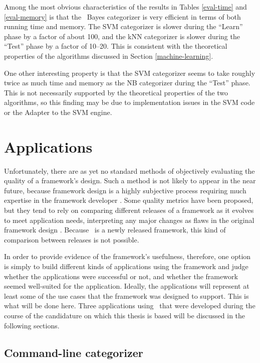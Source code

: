 Among the most obvious characteristics of the results in Tables
\ref{eval-time} and \ref{eval-memory} is that the \naive\ Bayes
categorizer is very efficient in terms of both running time and
memory.  The SVM categorizer is slower during the ``Learn'' phase by a
factor of about 100, and the kNN categorizer is slower during the
``Test'' phase by a factor of 10--20.  This is consistent with the
theoretical properties of the algorithms discussed in Section
\ref{machine-learning}.

One other interesting property is that the SVM categorizer seems to
take roughly twice as much time and memory as the NB categorizer
during the ``Test'' phase.  This is not necessarily supported by the
theoretical properties of the two algorithms, so this finding may be
due to implementation issues in the SVM code or the Adapter to the SVM
engine.


\section{Applications}
\label{Applications}

Unfortunately, there are as yet no standard methods of objectively
evaluating the quality of a framework's design.  Such a method is not
likely to appear in the near future, because framework design is a
highly subjective process requiring much expertise in the framework
developer \cite[sec. 1.5]{fayad:99}. Some quality metrics have been
proposed, but they tend to rely on comparing different releases of a
framework as it evolves to meet application needs, interpreting any
major changes as flaws in the original framework
design \cite[ch. 25]{fayad:99}. Because \aicat\ is a newly released
framework, this kind of comparison between releases is not possible.

In order to provide evidence of the framework's usefulness, therefore,
one option is simply to build different kinds of applications using
the framework and judge whether the applications were successful or
not, and whether the framework seemed well-suited for the application.
Ideally, the applications will represent at least some of the use
cases that the framework was designed to support.  This is what will
be done here.  Three applications using \aicat\ that were developed
during the course of the candidature on which this thesis is based
will be discussed in the following sections.

\subsection{Command-line categorizer}

